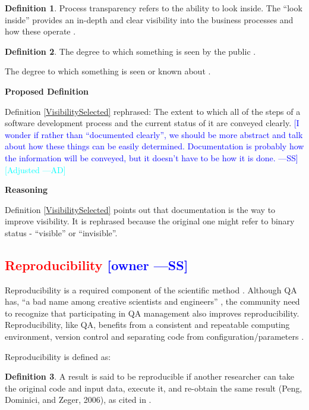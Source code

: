 \documentclass[letterpaper, cleveref]{lipics-v2019}
\newcommand{\authornote}[3]{\textcolor{#1}{[#3 ---#2]}}
\newcommand{\authornote}[3]{}
\newcommand{\wss}[1]{\authornote{blue}{SS}{#1}} %
\newcommand{\ad}[1]{\authornote{cyan}{AD}{#1}} %
\newcommand{\notdone}[1]{\textcolor{red}{#1}}
\theoremstyle{definition}
\newtheorem{defn}{Definition}
\begin{document}
\begin{defn}
  Process transparency refers to the ability to look inside. The “look inside”
  provides an in-depth and clear visibility into the business processes and how
  these operate \citep{PRIME2019}.
\end{defn}

\begin{defn}
The degree to which something is seen by the public
\citep{CambridgeVisibility2019}.
	
The degree to which something is seen or known about
\citep{CambridgeVisibility2019}.
\end{defn}

\noindent \textbf{Proposed Definition} 

Definition \ref{VisibilitySelected} rephrased: The extent to which all of
the steps of a software development process and the current status of it are
conveyed clearly. \wss{I wonder if rather than ``documented clearly'', we
should be more abstract and talk about how these things can be easily
determined.  Documentation is probably how the information will be conveyed,
  but it doesn't have to be how it is done.}  \ad{Adjusted}

\noindent \textbf{Reasoning}

Definition \ref{VisibilitySelected} points out that documentation is the way to
improve visibility. It is rephrased because the original one might refer to
binary status - ``visible'' or ``invisible''.


\subsection{\notdone{Reproducibility} \wss{owner}}

Reproducibility is a required component of the scientific method
\citep{Davison2012}.  Although QA has, ``a bad name among creative
scientists and engineers'' \citep[p.~352]{Roache1998}, the community need to
recognize that participating in QA management also improves reproducibility.
Reproducibility, like QA, benefits from a consistent and repeatable
computing environment, version control and separating code from
configuration/parameters \citep{Davison2012}.

Reproducibility is defined as:

\begin{defn}
  A result is said to be reproducible if another researcher can take the
  original code and input data, execute it, and re-obtain the same result
  (Peng, Dominici, and Zeger, 2006), as cited in
  \citet{BenureauAndRougier2017}.
\end{defn}
\end{document}
